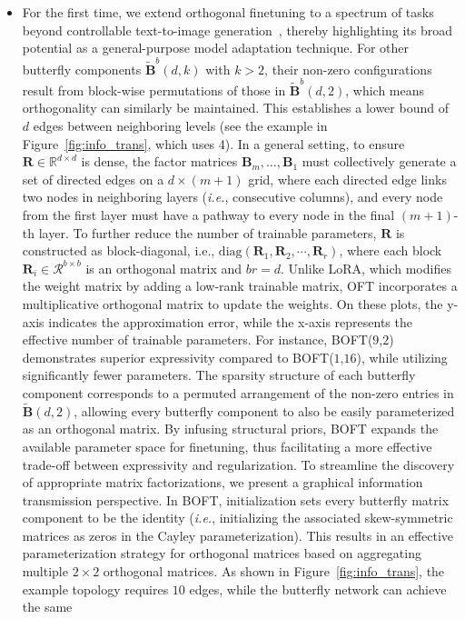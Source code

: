 \begin{itemize}[leftmargin=*,nosep]
Notable foundation models such as ChatGPT~\cite{brown2020language,chen2021evaluating} and Stable Diffusion~\cite{rombach2022high} have highlighted the extraordinary generalization capabilities of large-scale neural architectures. The orthogonal matrix $\bm{R}(m, b)\in\mathbb{R}^{d\times d}$ is constructed by multiplying several orthogonal butterfly matrices together. Among these, model finetuning is notable for its straightforwardness, its strong performance, and the important property that it does not incur additional latency at inference time. \item For the first time, we extend orthogonal finetuning to a spectrum of tasks beyond controllable text-to-image generation~\cite{qiu2023controlling}, thereby highlighting its broad potential as a general-purpose model adaptation technique. For other butterfly components $\tilde{\bm{B}}^b(d,k)$ with $k>2$, their non-zero configurations result from block-wise permutations of those in $\tilde{\bm{B}}^b(d,2)$, which means orthogonality can similarly be maintained. This establishes a lower bound of $d$ edges between neighboring levels (see the example in Figure~\ref{fig:info_trans}, which uses 4). In a general setting, to ensure $\bm{R}\in\mathbb{R}^{d\times d}$ is dense, the factor matrices $\bm{B}_m,\ldots,\bm{B}_1$ must collectively generate a set of directed edges on a $d\times(m+1)$ grid, where each directed edge links two nodes in neighboring layers (\emph{i.e.}, consecutive columns), and every node from the first layer must have a pathway to every node in the final $(m+1)$-th layer. To further reduce the number of trainable parameters, $\bm{R}$ is constructed as block-diagonal, i.e., $\text{diag}(\bm{R}_1,\bm{R}_2,\cdots,\bm{R}_r)$, where each block $\bm{R}_i\in\mathcal{R}^{b\times b}$ is an orthogonal matrix and $br=d$. Unlike LoRA, which modifies the weight matrix by adding a low-rank trainable matrix, OFT incorporates a multiplicative orthogonal matrix to update the weights. On these plots, the y-axis indicates the approximation error, while the x-axis represents the effective number of trainable parameters. For instance, BOFT($9$,$2$) demonstrates superior expressivity compared to BOFT($1$,$16$), while utilizing significantly fewer parameters. The sparsity structure of each butterfly component corresponds to a permuted arrangement of the non-zero entries in $\tilde{\bm{B}}(d,2)$, allowing every butterfly component to also be easily parameterized as an orthogonal matrix. By infusing structural priors, BOFT expands the available parameter space for finetuning, thus facilitating a more effective trade-off between expressivity and regularization. To streamline the discovery of appropriate matrix factorizations, we present a graphical information transmission perspective. In BOFT, initialization sets every butterfly matrix component to be the identity (\emph{i.e.}, initializing the associated skew-symmetric matrices as zeros in the Cayley parameterization). This results in an effective parameterization strategy for orthogonal matrices based on aggregating multiple $2 \times 2$ orthogonal matrices. As shown in Figure~\ref{fig:info_trans}, the example topology requires $10$ edges, while the butterfly network can achieve the same 
\end{itemize}
